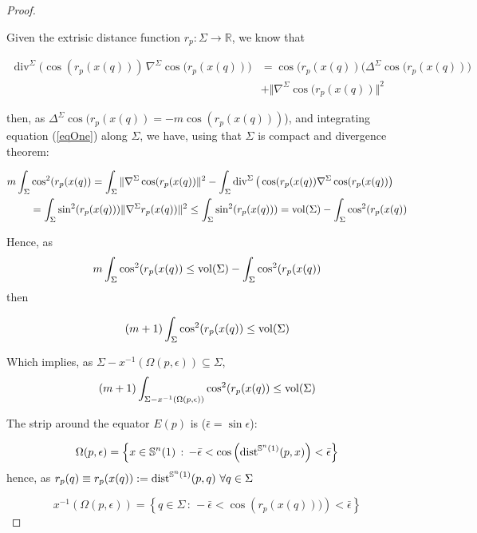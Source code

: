 \documentclass{amsart}
\theoremstyle{definition}
\theoremstyle{remark}
\newcommand{\Div}{\operatorname{div}}
\newcommand{\erre}{\mathbb{R}}
\begin{document}
\begin{proof}\


Given the extrisic distance function $r_p: \Sigma \rightarrow \erre$, we know that

\begin{equation}\label{eqOne}
\begin{aligned}
\Div^\Sigma\big(\cos (r_p(x(q)))\,\nabla^\Sigma \cos(r_p(x(q))\big)&=\cos(r_p(x(q))\big(\Delta^\Sigma\cos(r_p(x(q))\big)\\&+\Vert \nabla^\Sigma \cos(r_p(x(q))\Vert^2
\end{aligned}
\end{equation}

 \noindent then, as $\Delta^\Sigma \cos(r_p(x(q))=-m\cos(r_p(x(q)))$), and integrating equation (\ref{eqOne}) along $\Sigma$, we have, using that $\Sigma$ is compact and divergence theorem:


$$
\begin{aligned}
m\int_\Sigma& \cos^2(r_p(x(q))=\int_\Sigma\Vert \nabla^{\Sigma}  \cos(r_p(x(q))\Vert^2-\int_\Sigma \Div^\Sigma\big(\cos(r_p(x(q))\nabla^\Sigma \cos(r_p(x(q))\big)
\\&=\int_\Sigma \sin^2(r_p(x(q)))\Vert \nabla^{\Sigma} r_p(x(q))\Vert^2\leq \int_\Sigma \sin^2(r_p(x(q)))={\rm vol}(\Sigma)- \int_\Sigma \cos^2(r_p(x(q))
\end{aligned}
$$

Hence, as 
$$m\int_\Sigma \cos^2(r_p(x(q))\leq {\rm vol}(\Sigma)- \int_\Sigma \cos^2(r_p(x(q))$$ \noindent then

$$
(m+1)\int_\Sigma \cos^2(r_p(x(q))\leq {\rm vol}(\Sigma)
$$

Which implies, as  $\Sigma-x^{-1}(\Omega(p,\epsilon)) \subseteq \Sigma$,
$$
(m+1)\int_{\Sigma-x^{-1}(\Omega(p,\epsilon))} \cos^2(r_p(x(q))\leq {\rm vol}(\Sigma)
$$

 The strip around the equator $E(p)$ is ($\bar \epsilon=\sin \epsilon$):

$$
\Omega(p,\epsilon) =\left\lbrace x\in \mathbb{S}^{n}(1)\, : \, -\bar \epsilon<\cos\left({\rm dist}^{\mathbb{S}^{n}(1)}(p,x)\right)<\bar \epsilon\right\rbrace
$$
hence, as $r_p(q)\equiv r_p(x(q)):={\rm dist}^{\mathbb{S}^{n}(1)}(p,q)\,\,\forall q \in \Sigma$

$$
x^{-1}(\Omega(p,\epsilon))=\left\lbrace q \in \Sigma\,:\, -\bar \epsilon<\cos\left(r_p(x(q)))\right)<\bar \epsilon\right\rbrace
$$
\bigskip


\end{proof}
\end{document}
